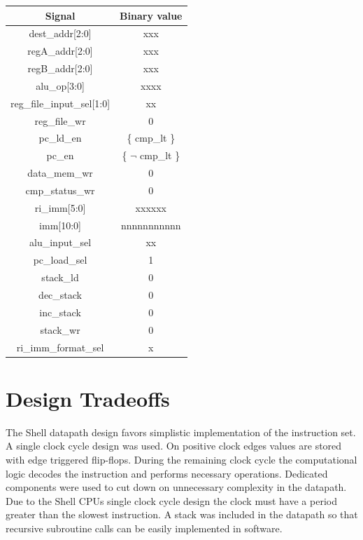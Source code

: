 \documentclass{article}
\begin{document}
\begin{par}
	\begin{center}
		\begin{tabular}{|c|c|}
			\hline 
			\textbf{Signal} & \textbf{Binary value} \\ 
			\hline 
			dest\_addr[2:0] & xxx \\ 
			\hline 
			regA\_addr[2:0] & xxx \\ 
			\hline 
			regB\_addr[2:0] & xxx \\ 
			\hline 
			alu\_op[3:0] & xxxx \\ 
			\hline 
			reg\_file\_input\_sel[1:0] & xx \\ 
			\hline 
			reg\_file\_wr & 0 \\ 
			\hline 
			pc\_ld\_en & \{ cmp\_lt \} \\ 
			\hline 
			pc\_en & \{ $ \lnot $ cmp\_lt \} \\ 
			\hline 
			data\_mem\_wr & 0 \\ 
			\hline 
			cmp\_status\_wr & 0 \\ 
			\hline 
			ri\_imm[5:0] & xxxxxx \\ 
			\hline 
			imm[10:0] & nnnnnnnnnnn \\ 
			\hline 
			alu\_input\_sel & xx \\ 
			\hline 
			pc\_load\_sel & 1 \\ 
			\hline 
			stack\_ld & 0 \\ 
			\hline 
			dec\_stack & 0 \\ 
			\hline 
			inc\_stack & 0 \\ 
			\hline 
			stack\_wr & 0 \\ 
			\hline 
			ri\_imm\_format\_sel & x \\ 
			\hline 
		\end{tabular} 
	\end{center}

\end{par}

\newpage

\section{Design Tradeoffs}
\label{destrad}
\begin{par}
	The Shell datapath design favors simplistic implementation of the instruction set. A single clock cycle design was used. On positive clock edges values are stored with edge triggered flip-flops. During the remaining clock cycle the computational logic decodes the instruction and performs necessary operations. Dedicated components were used to cut down on unnecessary complexity in the datapath. Due to the Shell CPUs single clock cycle design the clock must have a period greater than the slowest instruction. A stack was included in the datapath so that recursive subroutine calls can be easily implemented in software. 
\end{par}
\end{document}

